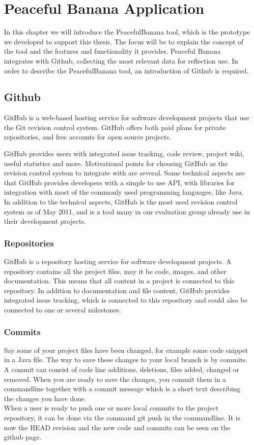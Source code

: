 \chapter{Peaceful Banana Application}
\label{peacefulBananaApplication}
In this chapter we will introduce the PeacefulBanana tool, which is the prototype we developed to support this thesis. The focus will be to explain the concept of the tool and the features and functionality it provides. 
Peaceful Banana integrates with Github, collecting the most relevant data for reflection use. In order to describe the PeacefulBanana tool, an introduction of Github is required.\\

\section{Github}
\label{githubchapter}
GitHub is a web-based hosting service for software development projects that use the Git revision control system\cite{git,github}. GitHub offers both paid plans for private repositories, and free accounts for open source projects.

GitHub provides users with integrated issue tracking, code review, project wiki, useful statistics and more. 
Motivational points for choosing GitHub as the revision control system to integrate with are several. Some technical aspects are that GitHub provides developers with a simple to use API\cite{githubapi}, with libraries for integration with most of the commonly used programming languages, like Java\cite{egit}.\\
In addition to the technical aspects, GitHub is the most used revision control system as of May 2011, and is a tool many in our evaluation group already use in their development projects\cite{githubnumbers}.

\subsection{Repositories}
GitHub is a repository hosting service for software development projects. A repository contains all the project files, may it be code, images, and other documentation. This means that all content in a project is connected to this repository. In addition to documentation and file content, GitHub provides integrated issue tracking, which is connected to this repository and could also be connected to one or several milestones. 
\subsection{Commits}
Say some of your project files have been changed, for example some code snippet in a Java file. The way to save these changes to your local branch is by commits. A commit can consist of code line additions, deletions, files added, changed or removed. When you are ready to save the changes, you commit them in a commandline together with a commit message which is a short text describing the changes you have done. \\
When a user is ready to push one or more local commits to the project repository, it can be done via the command git push in the commandline. It is now the HEAD revision and the new code and commits can be seen on the github page.
